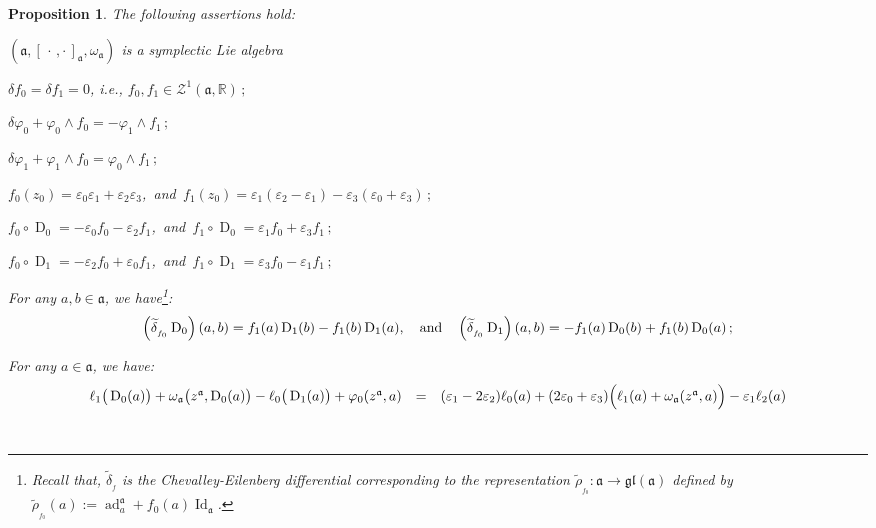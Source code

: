 \documentclass[final,1p,times,nopreprintline]{elsarticle}
\newtheorem{proposition}{Proposition}[section]
\theoremstyle{definition}
\numberwithin{equation}{section}
\newcommand{\ro}{\circ}
\newcommand{\rel}{\mathbb{R}}
\newcommand{\w}{\omega}
\newcommand{\et}{\quad \textnormal{and}\quad}
\newcommand{\id}{\operatorname{Id}}
\newcommand{\ai}{\mathfrak{a}}
\newcommand{\ad}{\operatorname{ad}}
\numberwithin{equation}{section}
\newcommand{\D}{\operatorname{D}}
\newcommand{\gl}{\mathfrak{gl}}
\begin{document}
\begin{proposition}\label{propCondDoublExtDim2}
	The following assertions hold:\vspace{1mm}
	\item[$1.$] $(\ai,[\,\cdot\,,\cdot\,]_\ai,\w_\ai)$ is a symplectic Lie algebra$\;$\vspace{1mm}
	\item[$2.$] $\delta f_0=\delta f_1=0$, i.e., $f_0,f_1\in\mathcal{Z}^1(\ai,\rel)\,;$\vspace{1mm} 
	\item[$3.$] $\delta\varphi_0+\varphi_0\wedge f_0=-\varphi_1\wedge f_1\,;$\vspace{1mm}
	\item[$4.$] $\delta\varphi_1+\varphi_1\wedge f_0=\varphi_0\wedge f_1\,;$\vspace{1mm}
	\item[$5.$] $f_0(z_0)=\varepsilon_0\varepsilon_1+\varepsilon_2\varepsilon_3$,\, and $\,f_1(z_0)=\varepsilon_1(\varepsilon_2-\varepsilon_1)-\varepsilon_3(\varepsilon_0+\varepsilon_3)\,;$\vspace{1mm}
	\item[$6.$] $f_0\ro\D_0=-\varepsilon_0f_0-\varepsilon_2f_1$,\, and $\,f_1\ro\D_0=\varepsilon_1f_0+\varepsilon_3f_1\,;$\vspace{1mm}
	\item[$7.$] $f_0\ro\D_1=-\varepsilon_2f_0+\varepsilon_0f_1$,\, and $\,f_1\ro\D_1=\varepsilon_3f_0-\varepsilon_1f_1\,;$\vspace{1mm}
	\item[$8.$] For any $a,b\in\ai$, we have\footnote{Recall that, $\widetilde{\delta}_{_f}$ is the Chevalley-Eilenberg differential corresponding to the representation $\widetilde{\rho}_{_{f_0}}:\ai\to\gl(\ai)$ defined by $\widetilde{\rho}_{_{f_0}}(a):=\ad^\ai_a+f_0(a)\id_\ai$.}:
	\begin{equation*}
\left(\widetilde{\delta}_{_{f_0}}\D_0\right)(a,b)=f_1(a)\D_1(b)-f_1(b)\D_1(a),\et
\left(\widetilde{\delta}_{_{f_0}}\D_1\right)(a,b)=-f_1(a)\D_0(b)+f_1(b)\D_0(a)\,;
	\end{equation*}
	\item[$9.$] For any $a\in\ai$, we have:
	\begin{equation*}
	\begin{array}{r c l}\vspace{0.75mm}
	\ell_1\big(\D_0(a)\big)+\w_\ai\big(z^\ai,\D_0(a)\big)-\ell_0\big(\D_1(a)\big)+\varphi_0(z^\ai,a)&=&(\varepsilon_1-2\varepsilon_2)\ell_0(a)+(2\varepsilon_0+\varepsilon_3)\Big(\ell_1(a)+\w_\ai(z^\ai,a)\Big)-\varepsilon_1\ell_2(a)\\\vspace{2.5mm}

\end{array}
\end{equation*}
\end{proposition}
\end{document}

